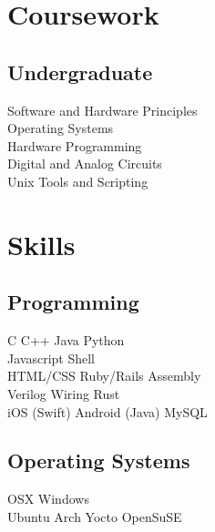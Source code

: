 \documentclass[]{deedy-resume-openfont}
\begin{document}
\begin{minipage}[t]{0.33\textwidth}
\section{Coursework}
\subsection{Undergraduate}
Software and Hardware Principles \\
Operating Systems \\
Hardware Programming \\
Digital and Analog Circuits \\
Unix Tools and Scripting \\
\sectionsep


\section{Skills}
\subsection{Programming}
C \textbullet{}   C++ \textbullet{} Java \textbullet{} Python \\
Javascript \textbullet{} Shell \\ 
HTML/CSS \textbullet{} Ruby/Rails \textbullet{} Assembly \\
Verilog \textbullet{} Wiring \textbullet{} Rust \\
iOS (Swift) \textbullet{} Android (Java) \textbullet{} MySQL \\
\medskip
\subsection{Operating Systems}
OSX \textbullet{} Windows \\
Ubuntu \textbullet{} Arch \textbullet{} Yocto \textbullet{} OpenSuSE
\sectionsep

%
%

\end{minipage} 
\hfill
\end{document}
